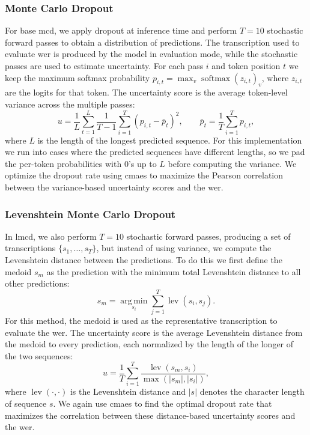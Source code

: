 \documentclass[runningheads]{llncs}
\begin{document}
\subsubsection{Monte Carlo Dropout}
For base \acrshort{mcd}, we apply dropout at inference time and perform $T = 10$ stochastic forward passes to obtain a distribution of predictions. The transcription used to evaluate \acrshort{wer} is produced by the model in evaluation mode, while the stochastic passes are used to estimate uncertainty. For each pass $i$ and token position $t$ we keep the maximum softmax probability $p_{i,t} = \max_v \operatorname{softmax}(z_{i,t})_v$, where $z_{i,t}$ are the logits for that token. The uncertainty score is the average token-level variance across the multiple passes:
\begin{equation}
    u = \frac{1}{L}\sum_{t=1}^{L} \frac{1}{T-1}\sum_{i=1}^{T}\left(p_{i,t} - \bar{p}_t\right)^2,
    \qquad \bar{p}_t = \frac{1}{T}\sum_{i=1}^{T} p_{i,t},
\end{equation}
where $L$ is the length of the longest predicted sequence.
For this implementation we run into cases where the predicted sequences have different lengths, so we pad the per-token probabilities with 0's up to $L$ before computing the variance.
We optimize the dropout rate using \acrshort{cmaes} to maximize the Pearson correlation between the variance-based uncertainty scores and the \acrshort{wer}.

\subsubsection{Levenshtein Monte Carlo Dropout}
In \acrshort{lmcd}, we also perform $T = 10$ stochastic forward passes, producing a set of transcriptions $\{s_1, \dots, s_T\}$, but instead of using variance, we compute the Levenshtein distance \cite{levenshtein1966binary} between the predictions. To do this we first define the medoid $s_m$ as the prediction with the minimum total Levenshtein distance to all other predictions:
\begin{equation}
    s_m = \operatorname*{arg\,min}_{s_i}\sum_{j=1}^{T} \operatorname{lev}(s_i, s_j).
\end{equation}
For this method, the medoid is used as the representative transcription to evaluate the \acrfull{wer}. The uncertainty score is the average Levenshtein\cite{levenshtein1966binary} distance from the medoid to every prediction, each normalized by the length of the longer of the two sequences:
\begin{equation}
    u = \frac{1}{T}\sum_{i=1}^{T} \frac{\operatorname{lev}(s_m, s_i)}{\max\left(|s_m|, |s_i|\right)},
\end{equation}
where $\operatorname{lev}(\cdot, \cdot)$ is the Levenshtein distance and $|s|$ denotes the character length of sequence $s$.
We again use \acrshort{cmaes} to find the optimal dropout rate that maximizes the correlation between these distance-based uncertainty scores and the \acrshort{wer}.
\end{document}
